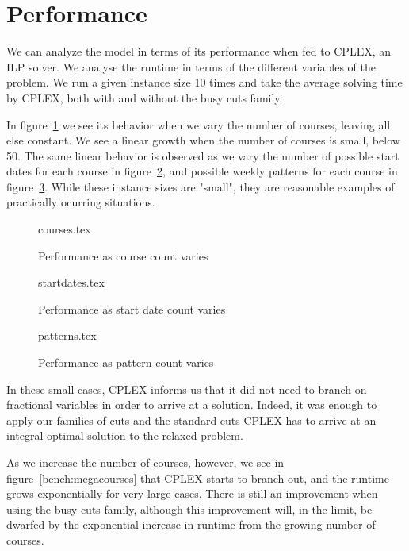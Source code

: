 \newpage
\section{Performance}

We can analyze the model in terms of its performance when fed to CPLEX, an ILP solver. We analyse the runtime in terms of the different variables of the problem. We run a given instance size 10 times and take the average solving time by CPLEX, both with and without the busy cuts family.

In figure~\ref{bench:courses} we see its behavior when we vary the number of courses, leaving all else constant. We see a linear growth when the number of courses is small, below 50. The same linear behavior is observed as we vary the number of possible start dates for each course in figure~\ref{bench:startdates}, and possible weekly patterns for each course in figure~\ref{bench:patterns}. While these instance sizes are "small", they are reasonable examples of practically ocurring situations.

\begin{figure}[b]
\begin{center}
{courses.tex}
\caption{Performance as course count varies}
\label{bench:courses}
\end{center}
\end{figure}

\begin{figure}
\begin{center}
{startdates.tex}
\caption{Performance as start date count varies}
\label{bench:startdates}
\end{center}
\end{figure}

\begin{figure}
\begin{center}
{patterns.tex}
\caption{Performance as pattern count varies}
\label{bench:patterns}
\end{center}
\end{figure}

In these small cases, CPLEX informs us that it did not need to branch on fractional variables in order to arrive at a solution. Indeed, it was enough to apply our families of cuts and the standard cuts CPLEX has to arrive at an integral optimal solution to the relaxed problem.

As we increase the number of courses, however, we see in figure~\ref{bench:megacourses} that CPLEX starts to branch out, and the runtime grows exponentially for very large cases. There is still an improvement when using the busy cuts family, although this improvement will, in the limit, be dwarfed by the exponential increase in runtime from the growing number of courses.

